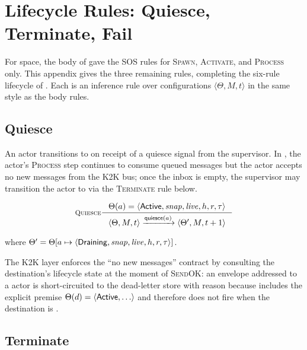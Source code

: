 \section{Lifecycle Rules: Quiesce, Terminate, Fail}
\label{app:lifecycle-rules}

For space, the body of  gave the SOS rules
for \textsc{Spawn}, \textsc{Activate}, and \textsc{Process} only.
This appendix gives the three remaining rules, completing the
six-rule lifecycle of .  Each is an
inference rule over configurations \(\langle \Theta, M, t\rangle\)
in the same style as the body rules.

\subsection{Quiesce}
\label{rule:quiesce}

An \Active{} actor transitions to \Draining{} on receipt of a
quiesce signal from the supervisor.  In \Draining{}, the actor's
\textsc{Process} step continues to consume queued messages but the
actor accepts no new messages from the K2K bus; once the inbox is
empty, the supervisor may transition the actor to \Terminated{}
via the \textsc{Terminate} rule below.

\begin{equation}
\inference[\textsc{Quiesce}]
{
  \Theta(a) = \langle \Active{}, \mathit{snap}, \mathit{live},
                       h, r, \tau\rangle
}
{
  \langle \Theta, M, t\rangle
  \trans{\mathsf{quiesce}(a)}
  \langle \Theta', M, t+1\rangle
}
\end{equation}

\noindent where
\(\Theta' = \Theta[a \mapsto
  \langle \mathsf{Draining}{}, \mathit{snap}, \mathit{live},
          h, r, \tau\rangle]\).

The K2K layer enforces the ``no new messages'' contract by
consulting the destination's lifecycle state at the moment of
\textsc{SendOK}: an envelope addressed to a \Draining{} actor is
short-circuited to the dead-letter store with reason
 because  includes the
explicit premise \(\Theta(d) = \langle\mathsf{Active}{}, \ldots\rangle\)
and therefore does not fire when the destination is \Draining{}.

\subsection{Terminate}
\label{rule:terminate}

